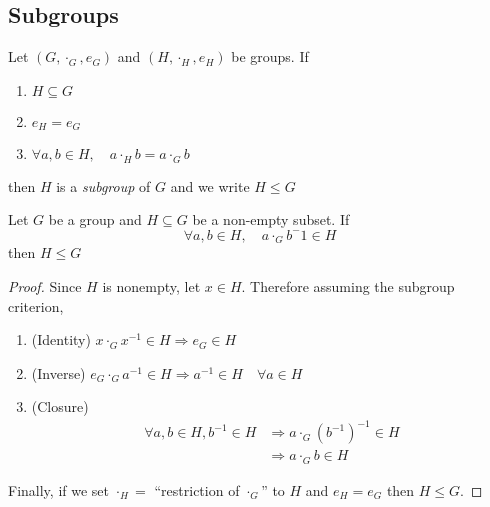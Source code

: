 \documentclass{article}
\begin{document}
\subsection{Subgroups}
\begin{defi}[Subgroup]
    Let $(G, \cdot_G, e_G)$ and $(H, \cdot_H, e_H)$ be groups. If
    \begin{enumerate}
        \item $H \subseteq G$
        \item $e_H = e_G$
        \item $\forall a, b \in H, \quad a \cdot_H b = a \cdot_G b$
    \end{enumerate}
    then $H$ is a \emph{subgroup} of $G$ and we write $H \leq G$
\end{defi}

\begin{prop}
    Let $G$ be a group and $H \subseteq G$ be a non-empty subset. If
    \[
        \forall a, b \in H, \quad a \cdot_G b^-1 \in H
    \]
    then $H \leq G$
\end{prop}

\begin{proof}
    Since $H$ is nonempty, let $x \in H$. Therefore assuming the subgroup criterion,
    \begin{enumerate}
        \item (Identity) $x \cdot_G x^{-1} \in H \Rightarrow e_G \in H$
        \item (Inverse) $e_G \cdot_G a^{-1} \in H \Rightarrow a^{-1} \in H \quad \forall a \in H$
        \item (Closure) \begin{align*}
            \forall a, b \in H, b^{-1} \in H \tag{by Inverse} &\Rightarrow a \cdot_G (b^{-1})^{-1} \in H \\
            &\Rightarrow a \cdot_G b \in H
        \end{align*}
    \end{enumerate}
    Finally, if we set $\cdot_H =$ ``restriction of $\cdot_G$'' to $H$ and $e_H = e_G$ then $H \leq G$. 
\end{proof}
\end{document}
